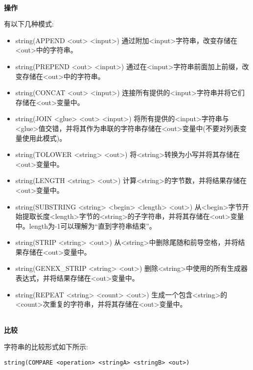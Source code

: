 \hspace*{\fill} \\ %
\noindent
\textbf{操作}

有以下几种模式:

\begin{itemize}
\item 
string(APPEND <out> <input>) 通过附加<input>字符串，改变存储在<out>中的字符串。

\item 
string(PREPEND <out> <input>) 通过在<input>字符串前面加上前缀，改变存储在<out>中的字符串。

\item 
string(CONCAT <out> <input>) 连接所有提供的<input>字符串并将它们存储在<out>变量中。

\item 
string(JOIN <glue> <out> <input>) 将所有提供的<input>字符串与<glue>值交错，并将其作为串联的字符串存储在<out>变量中(不要对列表变量使用此模式)。

\item
string(TOLOWER <string> <out>) 将<string>转换为小写并将其存储在<out>变量中。

\item
string(LENGTH <string> <out>) 计算<string>的字节数，并将结果存储在<out>变量中。

\item
string(SUBSTRING <string> <begin> <length> <out>) 从<begin>字节开始提取长度<length>字节的<string>的子字符串，并将其存储在<out>变量中。length为-1可以理解为“直到字符串结束”。

\item
string(STRIP <string> <out>) 从<string>中删除尾随和前导空格，并将结果存储在<out>变量中。

\item 
string(GENEX\_STRIP <string> <out>) 删除<string>中使用的所有生成器表达式，并将结果存储在<out>变量中。

\item 
string(REPEAT <string> <count> <out>) 生成一个包含<string>的<count>次重复的字符串，并将其存储在<out>变量中。
\end{itemize}


\hspace*{\fill} \\ %
\noindent
\textbf{比较}

字符串的比较形式如下所示:

\begin{lstlisting}[style=styleCMake]
string(COMPARE <operation> <stringA> <stringB> <out>)
\end{lstlisting}

